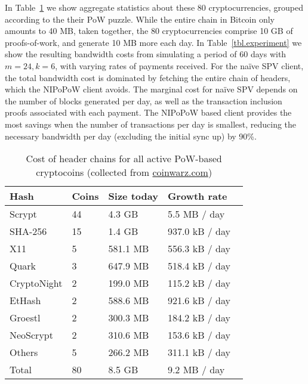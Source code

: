In Table~\ref{tbl.currencies} we show aggregate statistics about these 80
cryptocurrencies, grouped according to the their PoW puzzle. While the entire
chain in Bitcoin only amounts to 40 MB, taken together, the 80 cryptocurrencies
comprise 10 GB of proofs-of-work, and generate 10 MB more each day. In
Table~\ref{tbl.experiment} we show the resulting bandwidth costs from simulating
a period of 60 days with $m=24, k=6$, with varying rates of payments received.
%
For the na\"ive SPV client, the total bandwidth cost is dominated by fetching
the entire chain of headers, which the NIPoPoW client avoids. The marginal
cost for na\"ive SPV depends on the number of blocks generated per day, as well
as the transaction inclusion proofs associated with each payment. The NIPoPoW
based client provides the most savings when the number of transactions per day
is smallest, reducing the necessary bandwidth per day (excluding the initial
sync up) by 90\%.

\begin{table}
  \caption{Cost of header chains for all active PoW-based cryptocoins
           (collected from \url{coinwarz.com})}
  \label{tbl.currencies}
  \small
  \centering
  \begin{tabular}{l@{}|l|l|l@{}}
    {\bf Hash} & {\bf Coins} & {\bf Size today} & {\bf Growth rate}  \\
    \hline
    Scrypt  & 44  & 4.3 GB  & 5.5 MB / day \  \\
    SHA-256  & 15  & 1.4 GB  & 937.0 kB / day \  \\
    X11  & 5  & 581.1 MB  & 556.3 kB / day \  \\
    Quark  & 3  & 647.9 MB  & 518.4 kB / day \  \\
    CryptoNight  & 2  & 199.0 MB  & 115.2 kB / day \  \\
    EtHash  & 2  & 588.6 MB  & 921.6 kB / day \  \\
    Groestl  & 2  & 300.3 MB  & 184.2 kB / day \  \\
    NeoScrypt  & 2  & 310.6 MB  & 153.6 kB / day \  \\
    Others  & 5  & 266.2 MB  & 311.1 kB / day \  \\
    \hline
    Total  & 80   &  8.5 GB  & 9.2 MB  / day  \\
  \end{tabular}
\end{table}

